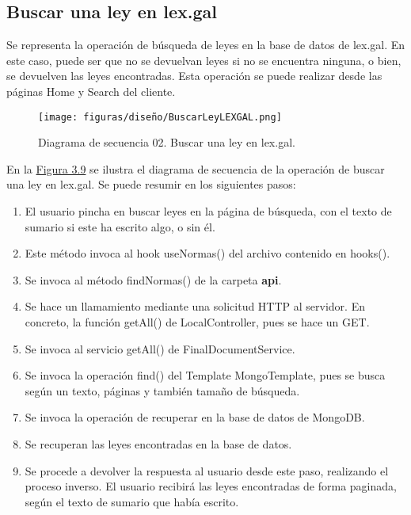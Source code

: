 \subsection{Buscar una ley en lex.gal}

Se representa la operación de búsqueda de leyes en la base de datos de lex.gal. En este caso, puede ser que no se devuelvan leyes si no se encuentra ninguna, o bien, se devuelven las leyes encontradas. Esta operación se puede realizar desde las páginas Home y Search del cliente.

\begin{figure}[H]
\centerline{\texttt{[image: figuras/diseño/BuscarLeyLEXGAL.png]}}
\caption{Diagrama de secuencia 02. Buscar una ley en lex.gal.}
\label{enlaceDBuscar}
\end{figure}

En la \hyperref[enlaceDRegistro]{Figura 3.9} se ilustra el diagrama de secuencia de la operación de buscar una ley en lex.gal. Se puede resumir en los siguientes pasos:

\begin{enumerate}
    \item El usuario pincha en buscar leyes en la página de búsqueda, con el texto de sumario si este ha escrito algo, o sin él.
    \item Este método invoca al hook useNormas() del archivo contenido en hooks().
    \item Se invoca al método findNormas() de la carpeta {\bf api}.
    \item Se hace un llamamiento mediante una solicitud HTTP al servidor. En concreto, la función getAll() de LocalController, pues se hace un GET.
    \item Se invoca al servicio getAll() de FinalDocumentService.
    \item Se invoca la operación find() del Template MongoTemplate, pues se busca según un texto, páginas y también tamaño de búsqueda.
    \item Se invoca la operación de recuperar en la base de datos de MongoDB.
    \item Se recuperan las leyes encontradas en la base de datos.
    \item Se procede a devolver la respuesta al usuario desde este paso, realizando el proceso inverso. El usuario recibirá las leyes encontradas de forma paginada, según el texto de sumario que había escrito.
\end{enumerate}